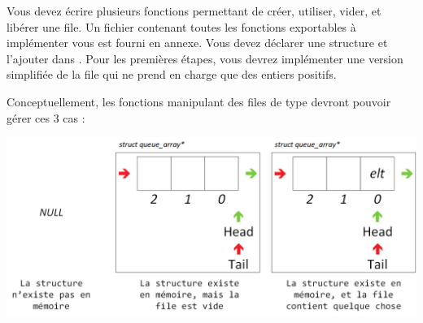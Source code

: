 

\vspace*{0.7cm}

\noindent {}

\bigskip

%

\noindent Vous devez écrire plusieurs fonctions permettant de créer, utiliser, vider, et libérer une file.
Un fichier  contenant toutes les fonctions exportables à implémenter vous est fourni en annexe.
Vous devez déclarer une structure  et l'ajouter dans .
Pour les premières étapes, vous devrez implémenter une version simplifiée de la file qui ne prend en charge que des entiers positifs.

\bigskip

\noindent Conceptuellement, les fonctions manipulant des files de type  devront pouvoir gérer ces 3 cas :

\bigskip

\begin{center}
\includegraphics[scale=0.85]{Cours/Files_Implementation_ARRAY.png}
\end{center}

\bigskip

